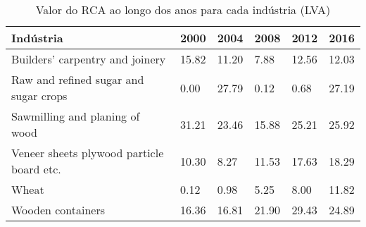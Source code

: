 \begin{table}
\centering
\caption{Valor do RCA ao longo dos anos para cada indústria (LVA)}
\label{tab:ex3-tempo-LVA}
\begin{tabular}{p{6cm}p{1.5cm}p{1.5cm}p{1.5cm}p{1.5cm}p{1.5cm}}
\toprule
                                Indústria &  2000 &  2004 &  2008 &  2012 &  2016 \\
\midrule
          Builders' carpentry and joinery & 15.82 & 11.20 &  7.88 & 12.56 & 12.03 \\
    Raw and refined sugar and sugar crops &  0.00 & 27.79 &  0.12 &  0.68 & 27.19 \\
           Sawmilling and planing of wood & 31.21 & 23.46 & 15.88 & 25.21 & 25.92 \\
Veneer sheets plywood particle board etc. & 10.30 &  8.27 & 11.53 & 17.63 & 18.29 \\
                                    Wheat &  0.12 &  0.98 &  5.25 &  8.00 & 11.82 \\
                        Wooden containers & 16.36 & 16.81 & 21.90 & 29.43 & 24.89 \\
\bottomrule
\end{tabular}
\end{table}
